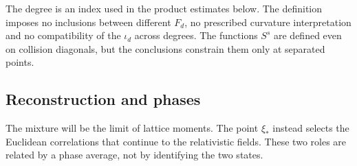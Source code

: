 The degree is an index used in the product estimates below.
The definition imposes no inclusions between different $F_d$, no prescribed curvature interpretation and no compatibility of the $\iota_d$ across degrees.
The functions $S^s$ are defined even on collision diagonals, but the conclusions constrain them only at separated points.

\subsection{Reconstruction and phases}\label{subsec:reconstruction}

The mixture will be the limit of lattice moments.
The point $\xi_*$ instead selects the Euclidean correlations that continue to the relativistic fields.
These two roles are related by a phase average, not by identifying the two states.

